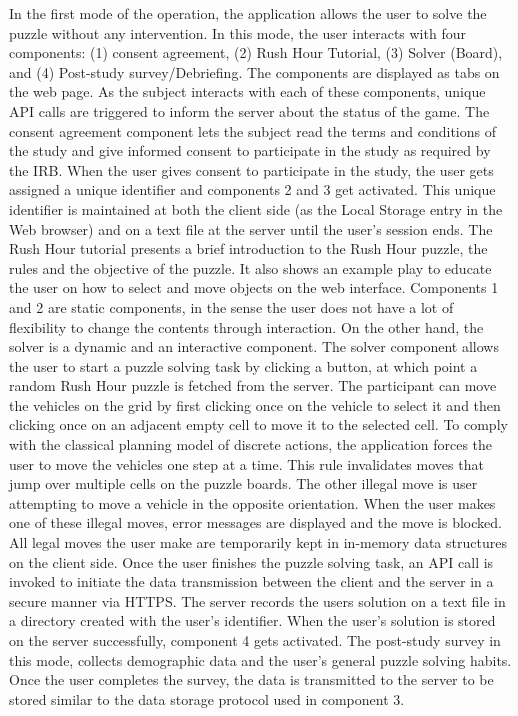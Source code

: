 In the first mode of the operation, the application allows the user to solve the puzzle without any intervention. In this mode, the user interacts with four components: (1) consent agreement, (2) Rush Hour Tutorial, (3) Solver (Board), and (4) Post-study survey/Debriefing. The components are displayed as tabs on the web page. As the subject interacts with each of these components, unique API calls are triggered to inform the server about the status of the game. The consent agreement component lets the subject read the terms and conditions of the study and give informed consent to participate in the study as required by the IRB. When the user gives consent to participate in the study, the user gets assigned a unique identifier and components 2 and 3 get activated. This unique identifier is maintained at both the client side (as the Local Storage entry in the Web browser) and on a text file at the server until the user's session ends. The Rush Hour tutorial presents a brief introduction to the Rush Hour puzzle, the rules and the objective of the puzzle. It also shows an example play to educate the user on how to select and move objects on the web interface. Components 1 and 2 are static components, in the sense the user does not have a lot of flexibility to change the contents through interaction. On the other hand, the solver is a dynamic and an interactive component. The solver component allows the user to start a puzzle solving task by clicking a button, at which point a random Rush Hour puzzle is fetched from the server. The participant can move the vehicles on the grid by first clicking once on the vehicle to select it and then clicking once on an adjacent empty cell to move it to the selected cell. To comply with the classical planning model of discrete actions, the application forces the user to move the vehicles one step at a time. This rule invalidates moves that jump over multiple cells on the puzzle boards. The other illegal move is user attempting to move a vehicle in the opposite orientation. When the user makes one of these illegal moves, error messages are displayed and the move is blocked. All legal moves the user make are temporarily kept in in-memory data structures on the client side. Once the user finishes the puzzle solving task, an API call is invoked to initiate the data transmission between the client and the server in a secure manner via HTTPS. The server records the users solution on a text file in a directory created with the user's identifier. When the user's solution is stored on the server successfully, component 4 gets activated. The post-study survey in this mode, collects demographic data and the user's general puzzle solving habits. Once the user completes the survey, the data is transmitted to the server to be stored similar to the data storage protocol used in component 3.

